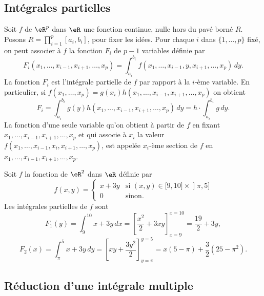 \subsection{Intégrales partielles}
Soit $f$ de $\eR^p$ dans $\eR$ une fonction continue, nulle hors du pavé borné $R$. Posons  $R=\prod_{i=1}^{p}[a_i,b_i]$, pour fixer les idées. Pour chaque $i$ dans $\{1,\ldots, p\}$ fixé, on peut associer à $f$ la fonction $F_i$ de $p-1$ variables définie par
\[
F_i(x_1,\ldots, x_{i-1}, x_{i+1}, \ldots, x_p)=\int_{a_i}^{b_i}f(x_1,\ldots, x_{i-1},y, x_{i+1}, \ldots, x_p)\, dy.
\]  
La fonction $F_i$ est l'intégrale partielle de $f$ par rapport à la $i$-ème variable. 
En particulier, si $f(x_1,\ldots, x_p)=g(x_i)h(x_1,\ldots, x_{i-1}, x_{i+1}, \ldots, x_p)$ on obtient 
\[
F_i=\int_{a_i}^{b_i}g(y)h(x_1,\ldots, x_{i-1}, x_{i+1}, \ldots, x_p)\, dy= h\cdot\int_{a_i}^{b_i}g \, dy.
\]  
La fonction d'une seule variable qu'on obtient à partir de $f$ en fixant $x_1,\ldots, x_{i-1}, x_{i+1}, \ldots, x_p$ et qui associe à $x_i$ la valeur $f(x_1,\ldots, x_{i-1}, x_i, x_{i+1}, \ldots, x_p)$, est appelée $x_i$-ème section de $f$ en $x_1,\ldots, x_{i-1}, x_{i+1}, \ldots, x_p$. 
\begin{example}
  Soit $f$ la fonction de $\eR^2$ dans $\eR$ définie par 
  \begin{equation}
	  f(x,y)=\begin{cases}
		  x+3y	&	\text{si $(x,y)\in\mathopen[ 9 , 10 \mathclose]\times\mathopen] \pi , 5 \mathclose]$}\\
		  0	&	 \text{sinon}.
	  \end{cases}
  \end{equation}
 Les intégrales partielles de $f$ sont 
\[
F_1(y)=\int_{9}^{10}x+3y\,dx=\left[\frac{x^2}{2}+3xy\right]_{x=9}^{x=10}=\frac{19}{2}+3y,
\]
\[
F_2(x)=\int_{\pi}^{5}x+3y\,dy=\left[xy+\frac{3y^2}{2}\right]_{y=\pi}^{y=5}=x(5-\pi)+\frac{3}{2}(25-\pi^2).
\]
\end{example}
\subsection{Réduction d'une intégrale multiple}
 
